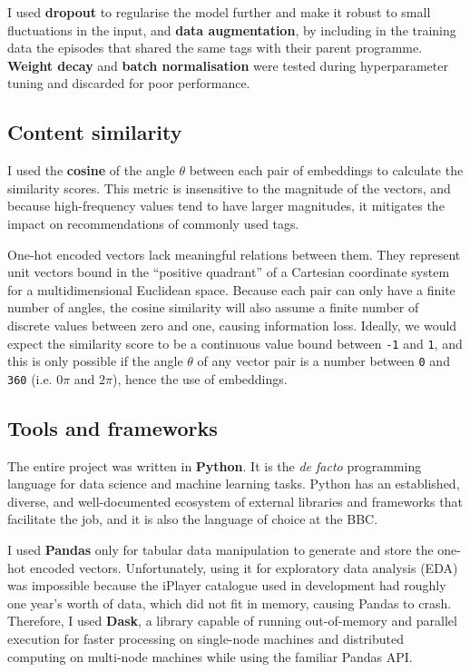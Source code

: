 I used \textbf{dropout} to regularise the model further and make it robust to small fluctuations in the input,
and \textbf{data augmentation}, by including in the training data the episodes that shared the same tags with their parent programme.
\textbf{Weight decay} and \textbf{batch normalisation} were tested during hyperparameter tuning and discarded for poor performance.

\subsection{Content similarity}

I used the \textbf{cosine} of the angle $\theta$ between each pair of embeddings to calculate the similarity scores.
This metric is insensitive to the magnitude of the vectors, and because high-frequency values tend to have larger magnitudes,
it mitigates the impact on recommendations of commonly used tags.

One-hot encoded vectors lack meaningful relations between them.
They represent unit vectors bound in the ``positive quadrant'' of a Cartesian coordinate system for a multidimensional Euclidean space.
Because each pair can only have a finite number of angles,
the cosine similarity will also assume a finite number of discrete values between zero and one, causing information loss.
Ideally, we would expect the similarity score to be a continuous value bound between \verb|-1| and \verb|1|,
and this is only possible if the angle $\theta$ of any vector pair is a number between \verb|0| and \verb|360|
(i.e. $0\pi$ and $2\pi$), hence the use of embeddings.

\subsection{Tools and frameworks}

The entire project was written in \textbf{Python}.
It is the \textit{de facto} programming language for data science and machine learning tasks.
Python has an established, diverse, and well-documented ecosystem of external libraries and frameworks that facilitate the job,
and it is also the language of choice at the BBC.

I used \textbf{Pandas} only for tabular data manipulation to generate and store the one-hot encoded vectors.
Unfortunately, using it for exploratory data analysis (EDA) was impossible
because the iPlayer catalogue used in development had roughly one year's worth of data,
which did not fit in memory, causing Pandas to crash.
Therefore, I used \textbf{Dask}, a library capable of running out-of-memory and parallel execution for faster processing
on single-node machines and distributed computing on multi-node machines while using the familiar Pandas API.

